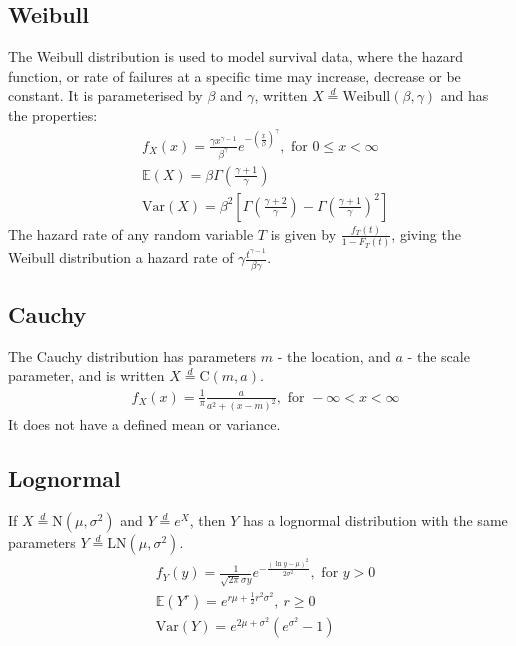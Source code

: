 \documentclass[titlepage,twocolumn]{article}
\begin{document}
\subsection*{Weibull}
The Weibull distribution is used to model survival data, where the hazard function, or rate of failures at a specific time may increase, decrease or be constant. It is parameterised by $\beta$ and $\gamma$, written $X\stackrel{d}{=}\mbox{Weibull}(\beta, \gamma)$ and has the properties:
\begin{align*}
    &f_X(x)=\frac{\gamma x^{\gamma - 1}}{\beta^\gamma}e^{-(\frac{x}{\beta})^\gamma}, \mbox{ for } 0 \leq x < \infty\\
    &\mathbb{E}(X)=\beta \Gamma\left(\frac{\gamma + 1}{\gamma}\right)\\
    &\mbox{Var}(X)=\beta^2 \left[\Gamma\left(\frac{\gamma + 2}{\gamma}\right)-\Gamma\left(\frac{\gamma + 1}{\gamma}\right)^2\right]
\end{align*}
The hazard rate of any random variable $T$ is given by $\frac{f_T(t)}{1-F_T(t)}$, giving the Weibull distribution a hazard rate of $\gamma \frac{t^{\gamma-1}}{\beta \gamma}$.

\subsection*{Cauchy}
The Cauchy distribution has parameters $m$ - the location, and $a$ - the scale parameter, and is written $X\stackrel{d}{=}\mbox{C}(m, a)$.
\begin{align*}
    &f_X(x)=\frac{1}{\pi} \frac{a}{a^2 + (x-m)^2}, \mbox{ for } -\infty < x < \infty
\end{align*}
It does not have a defined mean or variance.

\subsection*{Lognormal}
If $X \stackrel{d}{=} \mbox{N}(\mu, \sigma^2)$ and $Y \stackrel{d}{=} e^X$, then $Y$ has a lognormal distribution with the same parameters $Y \stackrel{d}{=} \mbox{LN}(\mu, \sigma^2)$.
\begin{align*}
    &f_Y(y)=\frac{1}{\sqrt{2\pi}\sigma y}e^{-\frac{(\ln y - \mu)^2}{2\sigma^2}}, \mbox{ for } y > 0\\
    &\mathbb{E}(Y^r)=e^{r\mu + \frac{1}{2}r^2 \sigma^2},\ r \geq 0\\
    &\mbox{Var}(Y)=e^{2\mu + \sigma^2}(e^{\sigma^2}-1)
\end{align*}
\end{document}
